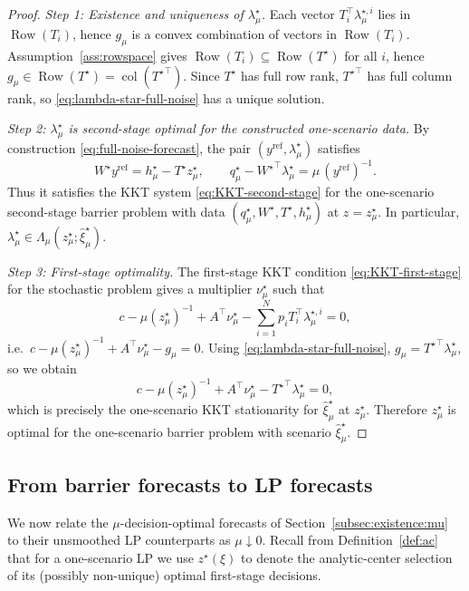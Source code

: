 \documentclass[11pt]{article}
\theoremstyle{plain}
\theoremstyle{definition}
\theoremstyle{remark}
\newcommand{\Row}{\operatorname{Row}}
\newcommand{\col}{\operatorname{col}}
\begin{document}
\begin{proof}
\emph{Step 1: Existence and uniqueness of $\lambda_\mu^\star$.}
Each vector $T_i^\top\lambda_{\mu}^{\star,i}$ lies in $\Row(T_i)$, hence $g_\mu$ is a convex combination of vectors in $\Row(T_i)$.
Assumption~\ref{ass:rowspace} gives $\Row(T_i)\subseteq\Row(T^\star)$ for all $i$, hence $g_\mu\in\Row(T^\star)=\col({T^\star}^\top)$.
Since $T^\star$ has full row rank, ${T^\star}^\top$ has full column rank, so \eqref{eq:lambda-star-full-noise} has a unique solution.

\emph{Step 2: $\lambda_\mu^\star$ is second-stage optimal for the constructed one-scenario data.}
By construction \eqref{eq:full-noise-forecast}, the pair $(y^{\mathrm{ref}},\lambda_\mu^\star)$ satisfies
\[
W^\star y^{\mathrm{ref}} = h_\mu^\star - T^\star z_\mu^\star,
\qquad
q_\mu^\star - {W^\star}^\top\lambda_\mu^\star = \mu\,(y^{\mathrm{ref}})^{-1}.
\]
Thus it satisfies the KKT system \eqref{eq:KKT-second-stage} for the one-scenario second-stage barrier problem with data
$(q_\mu^\star,W^\star,T^\star,h_\mu^\star)$ at $z=z_\mu^\star$. In particular,
$\lambda_\mu^\star\in\Lambda_\mu(z_\mu^\star;\hat\xi_\mu^\star)$.

\emph{Step 3: First-stage optimality.}
The first-stage KKT condition \eqref{eq:KKT-first-stage} for the stochastic problem gives a multiplier $\nu_\mu^\star$ such that
\[
c-\mu(z_\mu^\star)^{-1}+A^\top\nu_\mu^\star - \sum_{i=1}^N p_i T_i^\top\lambda_{\mu}^{\star,i}=0,
\]
i.e.\ $c-\mu(z_\mu^\star)^{-1}+A^\top\nu_\mu^\star-g_\mu=0$.
Using \eqref{eq:lambda-star-full-noise}, $g_\mu={T^\star}^\top\lambda_\mu^\star$, so we obtain
\[
c-\mu(z_\mu^\star)^{-1}+A^\top\nu_\mu^\star-{T^\star}^\top\lambda_\mu^\star=0,
\]
which is precisely the one-scenario KKT stationarity for $\hat\xi_\mu^\star$ at $z_\mu^\star$.
Therefore $z_\mu^\star$ is optimal for the one-scenario barrier problem with scenario $\hat\xi_\mu^\star$.
\end{proof}

\subsection{From barrier forecasts to LP forecasts}\label{subsec:existence:LP}

We now relate the $\mu$-decision-optimal forecasts of Section~\ref{subsec:existence:mu} to their unsmoothed
LP counterparts as $\mu\downarrow 0$. Recall from Definition~\ref{def:ac} that for a one-scenario LP
we use $z^\star(\xi)$ to denote the analytic-center selection of its (possibly non-unique) optimal first-stage decisions.
\end{document}
